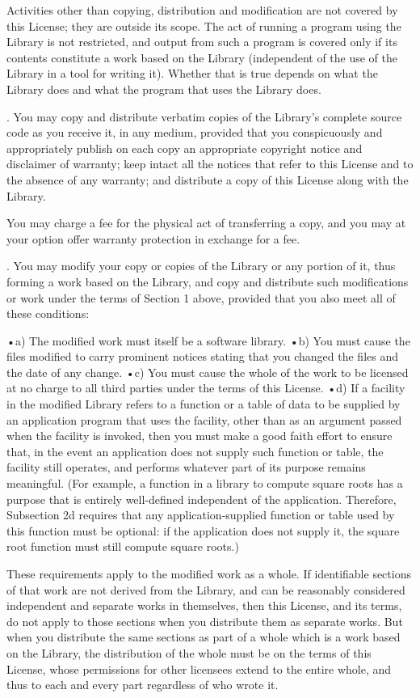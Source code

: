 Activities other than copying, distribution and modification are not covered by this License; they are outside its scope. The act of running a program using the Library is not restricted, and output from such a program is covered only if its contents constitute a work based on the Library (independent of the use of the Library in a tool for writing it). Whether that is true depends on what the Library does and what the program that uses the Library does. 

. You may copy and distribute verbatim copies of the Library's complete source code as you receive it, in any medium, provided that you conspicuously and appropriately publish on each copy an appropriate copyright notice and disclaimer of warranty; keep intact all the notices that refer to this License and to the absence of any warranty; and distribute a copy of this License along with the Library. 

You may charge a fee for the physical act of transferring a copy, and you may at your option offer warranty protection in exchange for a fee. 

. You may modify your copy or copies of the Library or any portion of it, thus forming a work based on the Library, and copy and distribute such modifications or work under the terms of Section 1 above, provided that you also meet all of these conditions: 

•a) The modified work must itself be a software library. 
•b) You must cause the files modified to carry prominent notices stating that you changed the files and the date of any change. 
•c) You must cause the whole of the work to be licensed at no charge to all third parties under the terms of this License. 
•d) If a facility in the modified Library refers to a function or a table of data to be supplied by an application program that uses the facility, other than as an argument passed when the facility is invoked, then you must make a good faith effort to ensure that, in the event an application does not supply such function or table, the facility still operates, and performs whatever part of its purpose remains meaningful. 
(For example, a function in a library to compute square roots has a purpose that is entirely well-defined independent of the application. Therefore, Subsection 2d requires that any application-supplied function or table used by this function must be optional: if the application does not supply it, the square root function must still compute square roots.)

These requirements apply to the modified work as a whole. If identifiable sections of that work are not derived from the Library, and can be reasonably considered independent and separate works in themselves, then this License, and its terms, do not apply to those sections when you distribute them as separate works. But when you distribute the same sections as part of a whole which is a work based on the Library, the distribution of the whole must be on the terms of this License, whose permissions for other licensees extend to the entire whole, and thus to each and every part regardless of who wrote it. 

